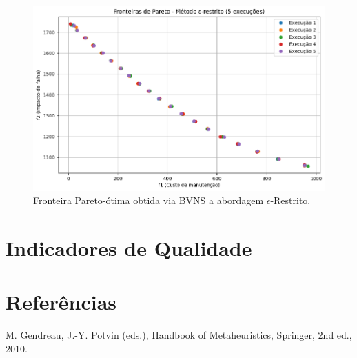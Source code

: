 \documentclass[
	12pt,				%
	oneside,			%
	a4paper,			%
	chapter=TITLE,
	sumario=tradicional,
	english,			%
	brazil				%
]{abntex2}
\begin{document}
\begin{figure}[h!]
	\caption{\label{fig:tc2-epsilon}Fronteira Pareto-ótima obtida via BVNS a 
	abordagem $\epsilon$-Restrito.}
	\begin{center}
    \includegraphics[width=\textwidth,trim=1 1 1 1,clip]{tc2-epsilon.png}
	\end{center}
\end{figure}


\chapter{Indicadores de Qualidade}\label{cap:analise} 



\chapter{Referências}\label{cap:referencias} 

\noindent M. Gendreau, J.-Y. Potvin (eds.), Handbook of Metaheuristics, Springer, 2nd ed., 2010.
\end{document}
